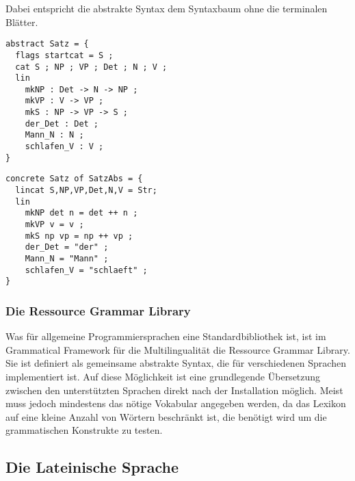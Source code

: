 \documentclass[draft,11pt]{scrartcl}
\begin{document}
Dabei entspricht die abstrakte Syntax dem Syntaxbaum ohne die terminalen Blätter.
\begin{minipage}{0.5\textwidth}
\begin{verbatim}
abstract Satz = {
  flags startcat = S ;
  cat S ; NP ; VP ; Det ; N ; V ;
  lin
    mkNP : Det -> N -> NP ;
    mkVP : V -> VP ;
    mkS : NP -> VP -> S ;
    der_Det : Det ;
    Mann_N : N ;
    schlafen_V : V ;
}
\end{verbatim}
\end{minipage}
\begin{minipage}{0.45\textwidth}
\begin{verbatim}
concrete Satz of SatzAbs = {
  lincat S,NP,VP,Det,N,V = Str;
  lin
    mkNP det n = det ++ n ;
    mkVP v = v ;           
    mkS np vp = np ++ vp ;
    der_Det = "der" ;     
    Mann_N = "Mann" ;
    schlafen_V = "schlaeft" ;
}
\end{verbatim}
\end{minipage}
\subsubsection{Die Ressource Grammar Library}
Was für allgemeine Programmiersprachen eine Standardbibliothek ist, ist im Grammatical Framework für die Multilingualität die Ressource Grammar Library. Sie ist definiert als gemeinsame abstrakte Syntax, die für verschiedenen Sprachen implementiert ist. Auf diese Möglichkeit ist eine grundlegende Übersetzung zwischen den unterstützten Sprachen direkt nach der Installation möglich. Meist muss jedoch mindestens das nötige Vokabular angegeben werden, da das Lexikon auf eine kleine Anzahl von Wörtern beschränkt ist, die benötigt wird um die grammatischen Konstrukte zu testen. \\
\subsection{Die Lateinische Sprache}
\end{document}
